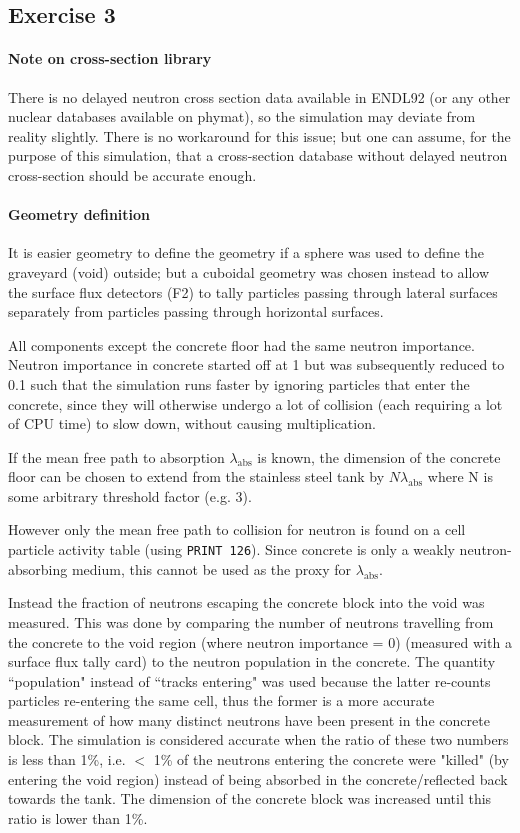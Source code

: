 \documentclass[a4paper, 12pt]{article}
\begin{document}
\subsection{Exercise 3}

\paragraph{Note on cross-section library} There is no delayed neutron cross section data available in ENDL92 (or any other nuclear databases available on phymat), so the simulation may deviate from reality slightly. There is no workaround for this issue; but one can assume, for the purpose of this simulation, that a cross-section database without delayed neutron cross-section should be accurate enough.

\paragraph{Geometry definition} It is easier geometry to define the geometry if a sphere was used to define the graveyard (void) outside; but a cuboidal geometry was chosen instead to allow the surface flux detectors (F2) to tally particles passing through lateral surfaces separately from particles passing through horizontal surfaces.

All components except the concrete floor had the same neutron importance. Neutron importance in concrete started off at 1 but was subsequently reduced to 0.1 such that the simulation runs faster by ignoring particles that enter the concrete, since they will otherwise undergo a lot of collision (each requiring a lot of CPU time) to slow down, without causing multiplication.

If the mean free path to absorption $\lambda_{\text{abs}}$ is known, the dimension of the concrete floor can be chosen to extend from the stainless steel tank by $N\lambda_{\text{abs}}$ where N is some arbitrary threshold factor (e.g. 3).

However only the mean free path to collision for neutron is found on a cell particle activity table (using \texttt{PRINT 126}). Since concrete is only a weakly neutron-absorbing medium, this cannot be used as the proxy for $\lambda_{\text{abs}}$.

Instead the fraction of neutrons escaping the concrete block into the void was measured. This was done by comparing the number of neutrons travelling from the concrete to the void region (where neutron importance = 0) (measured with a surface flux tally card) to the neutron population in the concrete. The quantity ``population" instead of ``tracks entering" was used because the latter re-counts particles re-entering the same cell, thus the former is a more accurate measurement of how many distinct neutrons have been present in the concrete block. The simulation is considered accurate when the ratio of these two numbers is less than 1\%, i.e. $<$ 1\% of the neutrons entering the concrete were "killed" (by entering the void region) instead of being absorbed in the concrete/reflected back towards the tank. The dimension of the concrete block was increased until this ratio is lower than 1\%.
\end{document}
